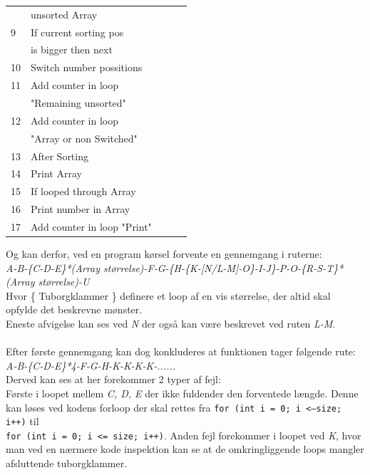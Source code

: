 \documentclass[11pt]{article}
\newcommand{\code}[1]{\colorbox{codegray}{\texttt{#1}}}
\begin{document}
\begin{table}[H]
\begin{minipage}{.35\textwidth}
\begin{tabular}{lllll}
                & unsorted Array\\
                9 & If current sorting pos\\
                & is bigger then next\\
                10 & Switch number possitions\\
                11 & Add counter in loop\\
                & "Remaining unsorted"\\
                12 & Add counter in loop\\
                & "Array or non Switched"\\
                13 & After Sorting\\
                14 & Print Array\\
                15 & If looped through Array\\
                16 & Print number in Array\\
                17 & Add counter in loop "Print"\\
            \end{tabular}
        \end{minipage}
    \end{table}
    \noindent
    Og kan derfor, ved en program kørsel forvente en gennemgang i ruterne:\\
    \textit{A-B-\{C-D-E\}*(Array størrelse)-F-G-\{H-\{K-[N/L-M]-O\}-I-J\}-P-O-\{R-S-T\}*(Array størrelse)-U}\\
    Hvor \{ Tuborgklammer \} definere et loop af en vis størrelse, der altid skal opfylde det beskrevne mønster.\\
    Eneste afvigelse kan ses ved \textit{N} der også kan være beskrevet ved ruten \textit{L-M}.\\\\
    Efter første gennemgang kan dog konkluderes at funktionen tager følgende rute:\\
    \textit{A-B-\{C-D-E\}*4-F-G-H-K-K-K-K-......}\\
    Derved kan ses at her forekommer 2 typer af fejl:\\
    Første i loopet mellem \textit{C, D, E} der ikke fuldender den forventede længde. Denne kan løses ved kodens forloop der skal rettes fra \code{for (int i = 0; i \textless --size; i++)} til\\ \code{for (int i = 0; i \textless = size; i++)}.
    Anden fejl forekommer i loopet ved \textit{K}, hvor man ved en nærmere kode inspektion kan se at de omkringliggende loops mangler afsluttende tuborgklammer.\\
\end{document}

